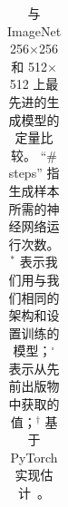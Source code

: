 \begin{table}[ht]
{\begin{tabular}{lc ccc ccc ccc cc}
    \end{tabular}
    }
    \vspace{-5pt}
    \caption{与 ImageNet 256$\times$256 和 512$\times$512 上最先进的生成模型的定量比较。
    \footnotesize{``\# steps” 指生成样本所需的神经网络运行次数。$^\ast$ 表示我们用与我们相同的架构和设置训练的模型；$^\square$ 表示从先前出版物中获取的值；$^\dagger$ 基于 PyTorch 实现估计~\cite{pytorch2020vqvae2}。}
    }
    \label{tab:maintable}

\end{table}




